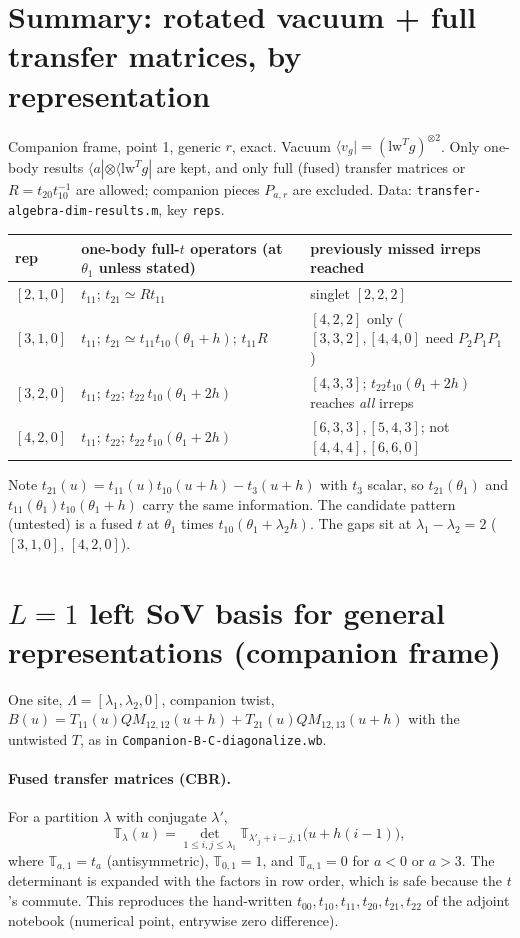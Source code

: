 \documentclass[11pt]{article}
\newcommand{\nb}[1]{\texttt{#1}}
\theoremstyle{definition}
\theoremstyle{remark}
\begin{document}
\section{Summary: rotated vacuum + full transfer matrices, by representation}
Companion frame, point 1, generic $r$, exact. Vacuum $\langle v_g|=(\mathrm{lw}^Tg)^{\otimes2}$. Only one-body results $\langle a|\otimes\langle\mathrm{lw}^Tg|$ are kept, and only full (fused) transfer matrices or $R=t_{20}t_{10}^{-1}$ are allowed; companion pieces $P_{a,r}$ are excluded. Data: \nb{transfer-algebra-dim-results.m}, key \texttt{reps}.
\begin{center}
\begin{tabular}{lll}\toprule
rep & one-body full-$t$ operators (at $\theta_1$ unless stated) & previously missed irreps reached\\\midrule
$[2,1,0]$ & $t_{11}$; $t_{21}\simeq Rt_{11}$ & singlet $[2,2,2]$\\
$[3,1,0]$ & $t_{11}$; $t_{21}\simeq t_{11}t_{10}(\theta_1{+}h)$; $t_{11}R$ & $[4,2,2]$ only ($[3,3,2],[4,4,0]$ need $P_2P_1P_1$)\\
$[3,2,0]$ & $t_{11}$; $t_{22}$; $t_{22}\,t_{10}(\theta_1{+}2h)$ & $[4,3,3]$; $t_{22}t_{10}(\theta_1{+}2h)$ reaches \emph{all} irreps\\
$[4,2,0]$ & $t_{11}$; $t_{22}$; $t_{22}\,t_{10}(\theta_1{+}2h)$ & $[6,3,3],[5,4,3]$; not $[4,4,4],[6,6,0]$\\\bottomrule
\end{tabular}
\end{center}
Note $t_{21}(u)=t_{11}(u)t_{10}(u+h)-t_3(u+h)$ with $t_3$ scalar, so $t_{21}(\theta_1)$ and $t_{11}(\theta_1)t_{10}(\theta_1+h)$ carry the same information. The candidate pattern (untested) is a fused $t$ at $\theta_1$ times $t_{10}(\theta_1+\lambda_2h)$. The gaps sit at $\lambda_1-\lambda_2=2$ ($[3,1,0]$, $[4,2,0]$).

\section{$L=1$ left SoV basis for general representations (companion frame)}
One site, $\Lambda=[\lambda_1,\lambda_2,0]$, companion twist, $B(u)=T_{11}(u)QM_{12,12}(u+h)+T_{21}(u)QM_{12,13}(u+h)$ with the untwisted $T$, as in \nb{Companion-B-C-diagonalize.wb}.

\paragraph{Fused transfer matrices (CBR).} For a partition $\lambda$ with conjugate $\lambda'$,
\[
\mathbb T_\lambda(u)=\det_{1\le i,j\le\lambda_1}\mathbb T_{\lambda'_j+i-j,1}\big(u+h(i-1)\big),
\]
where $\mathbb T_{a,1}=t_a$ (antisymmetric), $\mathbb T_{0,1}=1$, and $\mathbb T_{a,1}=0$ for $a<0$ or $a>3$. The determinant is expanded with the factors in row order, which is safe because the $t$'s commute. This reproduces the hand-written $t_{00},t_{10},t_{11},t_{20},t_{21},t_{22}$ of the adjoint notebook (numerical point, entrywise zero difference).
\end{document}
